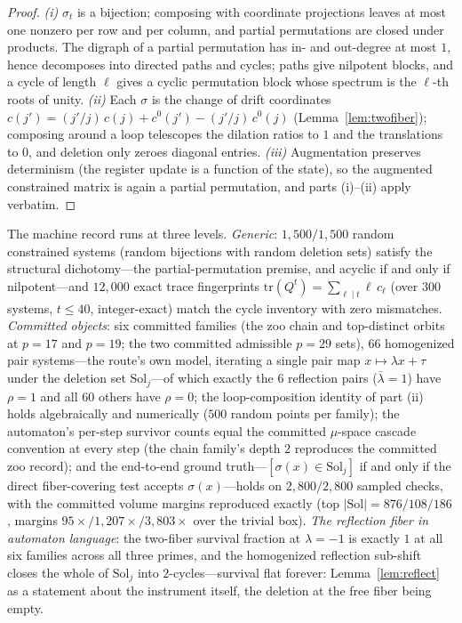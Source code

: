 \begin{proof}
\emph{(i)} $\sigma_t$ is a bijection; composing with coordinate
projections leaves at most one nonzero per row and per column, and
partial permutations are closed under products. The digraph of a
partial permutation has in- and out-degree at most $1$, hence
decomposes into directed paths and cycles; paths give nilpotent
blocks, and a cycle of length $\ell$ gives a cyclic permutation block
whose spectrum is the $\ell$-th roots of unity.
\emph{(ii)} Each $\sigma$ is the change of drift coordinates
$c(j')=(j'/j)\,c(j)+c^0(j')-(j'/j)\,c^0(j)$
(Lemma~\ref{lem:twofiber}); composing around a loop telescopes the
dilation ratios to $1$ and the translations to $0$, and deletion only
zeroes diagonal entries. \emph{(iii)} Augmentation preserves
determinism (the register update is a function of the state), so the
augmented constrained matrix is again a partial permutation, and
parts (i)--(ii) apply verbatim.
\end{proof}

The machine record runs at three levels. \emph{Generic}:
$1{,}500/1{,}500$ random constrained systems (random bijections with
random deletion sets) satisfy the structural dichotomy---the
partial-permutation premise, and acyclic if and only if
nilpotent---and $12{,}000$ exact trace fingerprints
$\mathrm{tr}(Q^t)=\sum_{\ell\mid t}\ell\,c_\ell$ (over $300$ systems,
$t\le 40$, integer-exact) match the cycle inventory with zero
mismatches. \emph{Committed objects}: six committed families (the zoo
chain and top-distinct orbits at $p=17$ and $p=19$; the two committed
admissible $p=29$ sets), $66$ homogenized pair systems---the route's
own model, iterating a single pair map $x\mapsto\lambda x+\tau$ under
the deletion set $\mathrm{Sol}_j$---of which exactly the $6$
reflection pairs ($\bar\lambda=1$) have $\rho=1$ and all $60$ others
have $\rho=0$; the loop-composition identity of part (ii) holds
algebraically and numerically ($500$ random points per family); the
automaton's per-step survivor counts equal the committed $\mu$-space
cascade convention at every step (the chain family's depth $2$
reproduces the committed zoo record); and the end-to-end ground
truth---$[\sigma(x)\in\mathrm{Sol}_j]$ if and only if the direct
fiber-covering test accepts $\sigma(x)$---holds on $2{,}800/2{,}800$
sampled checks, with the committed volume margins reproduced exactly
(top $|\mathrm{Sol}|=876/108/186$, margins
$95\times/1{,}207\times/3{,}803\times$ over the trivial box).
\emph{The reflection fiber in automaton language}: the two-fiber
survival fraction at $\lambda=-1$ is exactly $1$ at all six families
across all three primes, and the homogenized reflection sub-shift
closes the whole of $\mathrm{Sol}_j$ into $2$-cycles---survival flat
forever: Lemma~\ref{lem:reflect} as a statement about the instrument
itself, the deletion at the free fiber being empty.

